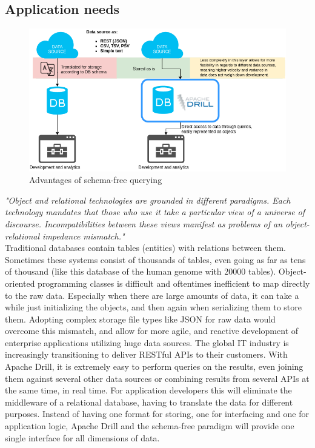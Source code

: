 \documentclass[a4paper,english]{report}
\begin{document}
			\subsection{Application needs}
			\begin{figure}[h]
					\includegraphics[width=\textwidth]{drill_advantages}
					\caption{Advantages of schema-free querying}
			\end{figure}
			\textit{"Object and relational technologies are grounded in
			different paradigms. Each technology mandates that
			those who use it take a particular view of a universe
			of discourse. Incompatibilities between these views
			manifest as problems of an object-relational
			impedance mismatch."}\cite{impedance}
			\\
			Traditional databases contain tables (entities) with relations between them. Sometimes these systems consist of thousands of tables, even going as far as tens of thousand (like this database of the human genome with 20000 tables\cite{humangenome}). Object-oriented programming classes is difficult and oftentimes inefficient to map directly to the raw data. Especially when there are large amounts of data, it can take a while just initializing the objects, and then again when serializing them to store them. Adopting complex storage file types like JSON for raw data would overcome this mismatch, and allow for more agile, and reactive development of enterprise applications utilizing huge data sources. The global IT industry is increasingly transitioning to deliver RESTful APIs to their customers. With Apache Drill, it is extremely easy to perform queries on the results, even joining them against several other data sources or combining results from several APIs at the same time, in real time. For application developers this will eliminate the middleware of a relational database, having to translate the data for different purposes. Instead of having one format for storing, one for interfacing and one for application logic, Apache Drill and the schema-free paradigm will provide one single interface for all dimensions of data.
		
\end{document}

